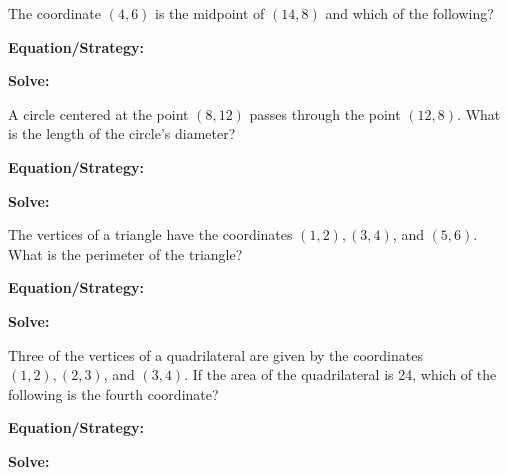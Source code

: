 \vfill
\newpage
\begin{multicols*}{2}
\begin{outline}[enumerate]
\medium

\1 The coordinate $(4,6)$ is the midpoint of $(14, 8)$ and which of the following?

\bigskip
\textbf{Equation/Strategy:} \hrulefill

\bigskip
\textbf{Solve:}

\vfill
\2 
\2 
\2 
\2 
\2 

\midline

\bigskip
\1 A circle centered at the point $(8,12)$ passes through the point $(12,8)$. What is the length of the circle's diameter?

\bigskip
\textbf{Equation/Strategy:} \hrulefill

\bigskip
\textbf{Solve:}

\vfill
\2 
\2 
\2 
\2 
\2 

\columnbreak
\advanced

\1 The vertices of a triangle have the coordinates $(1,2), (3,4)$, and $(5,6)$. What is the perimeter of the triangle?

\bigskip
\textbf{Equation/Strategy:} \hrulefill

\bigskip
\textbf{Solve:}

\vfill
\2 
\2 
\2 
\2 
\2 

\midline

\1 Three of the vertices of a quadrilateral are given by the coordinates $(1,2), (2,3)$, and $(3,4)$. If the area of the quadrilateral is 24, which of the following is the fourth coordinate?

\bigskip
\textbf{Equation/Strategy:}

\bigskip
\textbf{Solve:}

\vfill
\2
\2
\2
\2
\2
\end{outline}
\end{multicols*}
